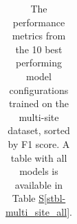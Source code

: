 \documentclass[
]{scrreprt}
\newcommand*\quartostblref[1]{Table \hyperref[#1]{S\ref{#1}}}
\begin{document}
\begin{longtable}[]{@{}
  >{\raggedright\arraybackslash}p{}
  >{\raggedright\arraybackslash}p{}
  >{\raggedright\arraybackslash}p{}
  >{\raggedright\arraybackslash}p{}
  >{\raggedright\arraybackslash}p{}
  >{\raggedright\arraybackslash}p{}
  >{\raggedright\arraybackslash}p{}@{}}

\caption{\label{tbl-multi_site}The performance metrics from the 10 best
performing model configurations trained on the multi-site dataset,
sorted by F1 score. A table with all models is available in
\quartostblref{stbl-multi_site_all}.}

\tabularnewline


\end{longtable}
\end{document}
